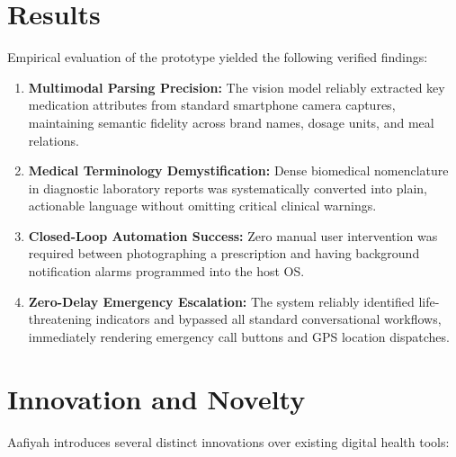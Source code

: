 \documentclass[12pt,a4paper,oneside]{report}
\begin{document}
\chapter{Results}

Empirical evaluation of the prototype yielded the following verified findings:

\begin{enumerate}
    \item \textbf{Multimodal Parsing Precision:} The vision model reliably extracted key medication attributes from standard smartphone camera captures, maintaining semantic fidelity across brand names, dosage units, and meal relations.
    \item \textbf{Medical Terminology Demystification:} Dense biomedical nomenclature in diagnostic laboratory reports was systematically converted into plain, actionable language without omitting critical clinical warnings.
    \item \textbf{Closed-Loop Automation Success:} Zero manual user intervention was required between photographing a prescription and having background notification alarms programmed into the host OS.
    \item \textbf{Zero-Delay Emergency Escalation:} The system reliably identified life-threatening indicators and bypassed all standard conversational workflows, immediately rendering emergency call buttons and GPS location dispatches.
\end{enumerate}

\chapter{Innovation and Novelty}

Aafiyah introduces several distinct innovations over existing digital health tools:
\end{document}
